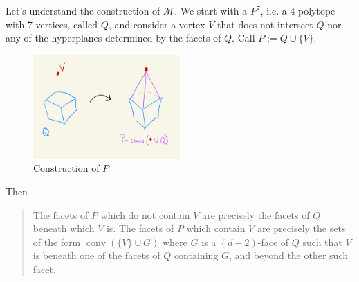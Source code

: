 Let's understand the construction of \(\mathcal{M}\). We start with a \(P^7\), i.e. a 4-polytope with 7 vertices, called \(Q\), and consider a vertex \(V\) that does not intersect \(Q\) nor any of the hyperplanes determined by the facets of \(Q\). Call \(P:=Q \cup  \{V\}\).
\begin{figure}[H]
	\centering
	\includegraphics[width=0.5\textwidth]{fig5}
	\caption*{Construction of \(P\)}
\end{figure}
Then
\begin{quotation}
The facets of  \(P\) which do not contain \(V\) are precisely the facets of \(Q\) beneath which \(V\) is. The facets of \(P\) which contain \(V\) are precisely the sets of the form \(\operatorname{conv}(\{V\}\cup G)\) where \(G\) is a \((d-2)\)-face of \(Q\) such that \(V\) is beneath one of the facets of \(Q\) containing \(G\), and beyond the other such facet.
\end{quotation}

